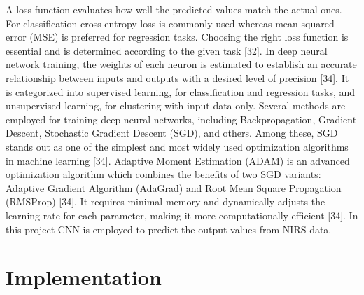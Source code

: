 \documentclass[12pt,a4paper]{report}
\begin{document}
A loss function evaluates how well the predicted values match the actual ones.  For classification cross-entropy loss is commonly used whereas mean squared error (MSE) is preferred for regression tasks. Choosing the right loss function is essential and is determined according to the given task [32]. In deep neural network training, the weights of each neuron is estimated to establish an accurate relationship between inputs and outputs with a desired level of precision [34].
It is categorized into supervised learning, for classification and regression tasks, and unsupervised learning, for clustering with input data only. Several methods are employed for training deep neural networks, including Backpropagation, Gradient Descent, Stochastic Gradient Descent (SGD), and others. Among these, SGD stands out as one of the simplest and most widely used optimization algorithms in machine learning [34]. Adaptive Moment Estimation (ADAM) is an advanced 
optimization algorithm which combines the benefits of two SGD variants: Adaptive Gradient Algorithm (AdaGrad) and Root Mean Square Propagation (RMSProp) [34]. It requires minimal memory and dynamically adjusts the learning rate for each parameter, making it more computationally efficient [34]. In this project CNN is employed to predict the output values from NIRS data. \\



\chapter{Implementation}
\end{document}
